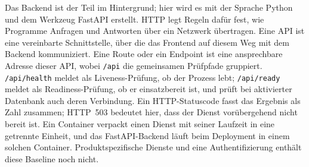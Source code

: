 \begin{beginnerstatement}

Das Backend ist der Teil im Hintergrund; hier wird es mit der Sprache Python
und dem Werkzeug FastAPI erstellt. HTTP legt Regeln dafür fest, wie Programme
Anfragen und Antworten über ein Netzwerk übertragen. Eine API ist eine
vereinbarte Schnittstelle, über die das Frontend auf diesem Weg mit dem Backend
kommuniziert.
Eine Route oder ein Endpoint ist eine ansprechbare Adresse dieser API, wobei
\texttt{/api} die gemeinsamen Prüfpfade gruppiert. \texttt{/api/health} meldet
als Liveness-Prüfung, ob der Prozess lebt; \texttt{/api/ready} meldet als
Readiness-Prüfung, ob er einsatzbereit ist, und prüft bei aktivierter Datenbank
auch deren Verbindung. Ein HTTP-Statuscode fasst das Ergebnis als Zahl
zusammen; HTTP~503 bedeutet hier, dass der Dienst vorübergehend nicht bereit
ist. Ein Container verpackt einen Dienst mit seiner Laufzeit in eine getrennte
Einheit, und das FastAPI-Backend läuft beim Deployment in einem solchen
Container. Produktspezifische Dienste und eine Authentifizierung enthält diese
Baseline noch nicht.

\end{beginnerstatement}

